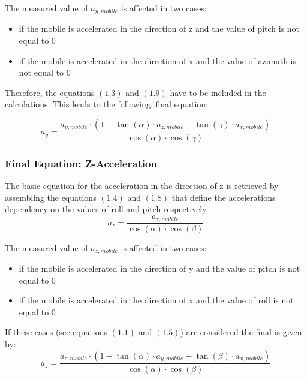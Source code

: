 \documentclass[12pt, a4paper, oneside, british]{article}
\begin{document}
\noindent The measured value of $a_{y,mobile}$ is affected in two cases:
\begin{itemize}
\item{if the mobile is accelerated in the direction of z and the value of pitch is not equal to 0}
\item{if the mobile is accelerated in the direction of x and the value of azimuth is not equal to 0}
\end{itemize}
Therefore, the equations $(1.3)$ and $(1.9)$ have to be included in the
calculations.
This leads to the following, final equation:

\begin{equation}
a_y = \frac{a_{y, mobile} \cdot (1 - \tan(\alpha) \cdot a_{z, mobile}
- \tan(\gamma) \cdot a_{x, mobile})}{\cos(\alpha) \cdot \cos(\gamma)}
\end{equation}

\subsubsection{Final Equation: Z-Acceleration }
The basic equation for the acceleration in the direction of z is retrieved by assembling the equations $(1.4)$ and $(1.8)$ that define the accelerations dependency on the values of roll and pitch respectively. 
\begin{equation}
a_z = \frac{a_{z, mobile}}{\cos(\alpha) \cdot \cos(\beta)}
\end{equation}

\noindent The measured value of $a_{z,mobile}$ is affected in two cases:
\begin{itemize}
\item{if the mobile is accelerated in the direction of y and the value of pitch is not equal to 0}
\item{if the mobile is accelerated in the direction of x and the value of roll is not equal to 0}
\end{itemize}

If these cases (see equations $(1.1)$ and $(1.5)$) are considered the final is given by:
\begin{equation}
a_z = \frac{a_{z, mobile} \cdot (1 - \tan(\alpha) \cdot a_{y, mobile}
- \tan(\beta) \cdot a_{x, mobile})}{\cos(\alpha) \cdot \cos(\beta)}
\end{equation}
\end{document}
